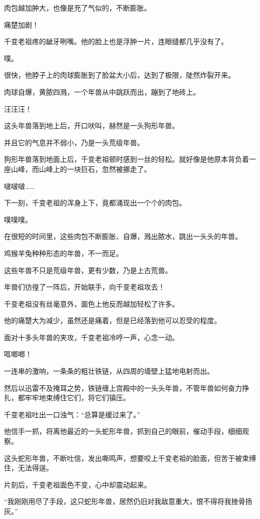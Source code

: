 \begin{this_body}
肉包越加肿大，也像是充了气似的，不断膨胀。

痛楚加剧！

千变老祖疼的龇牙咧嘴。他的脸上也是浮肿一片，连眼缝都几乎没有了。

噗。

很快，他脖子上的肉球膨胀到了脸盆大小后，达到了极限，陡然炸裂开来。

肉球自爆，黄脓四溅，一个年兽从中跳跃而出，蹦到了地砖上。

汪汪汪！

这头年兽落到地上后，开口吠叫，赫然是一头狗形年兽。

并且它的气息并不弱小，乃是一头荒级年兽。

狗形年兽落到地面上后，千变老祖顿时感到一丝的轻松。就好像是他原本背负着一座山峰，而山峰上的一块巨石，忽然被挪走了。

啵啵啵……

下一刻，千变老祖的浑身上下，竟都涌现出一个个的肉包。

噗噗噗。

在很短的时间里，这些肉包不断膨胀、自爆，溅出脓水，跳出一头头的年兽。

鸡猴羊兔种种形态的年兽，不一而足。

这些年兽不只是荒级年兽，更有少数，乃是上古荒兽。

年兽们彷徨了一阵后，开始联手，向千变老祖攻去！

千变老祖没有丝毫意外，面色上他反而越加轻松了许多。

他的痛楚大为减少，虽然还是痛着，但是已经落到他可以忍受的程度。

面对十多头年兽的夹攻，千变老祖冷哼一声，心念一动。

哐啷啷！

一连串的激响，一条条的粗壮铁链，从四周的墙壁上猛地电射而出。

然后以迅雷不及掩耳之势，铁链缠上宫殿中的一头头年兽，不管年兽如何奋力挣扎，都牢牢地束缚住它们，将它们镇压。

千变老祖吐出一口浊气：“总算是缓过来了。”

他信手一抓，将离他最近的一头蛇形年兽，抓到自己的眼前，催动手段，细细观察。

这头蛇形年兽，不断吐信，发出嘶鸣声，想要咬上千变老祖的脸面，但苦于被束缚住，无法得逞。

片刻后，千变老祖面色不变，心中却震动起来。

“我刚刚用尽了手段，这只蛇形年兽，居然仍旧对我敌意重大，恨不得将我挫骨扬灰。”


\end{this_body}
